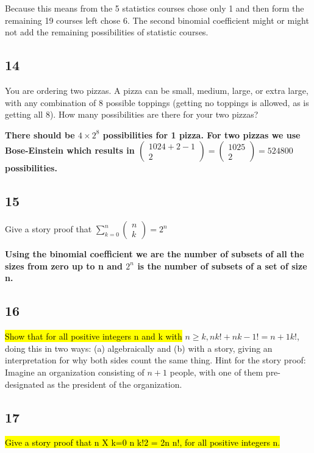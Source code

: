 \documentclass{article}
\begin{document}
\begin{enumerate}
    Because this means from the 5 statistics courses chose only 1 and then form the remaining 19 courses left chose 6. The second binomial coefficient might or might not add the remaining possibilities of statistic courses.
\end{enumerate}
\subsection{14}
You are ordering two pizzas. A pizza can be small, medium, large, or extra large, with any combination of 8 possible toppings (getting no toppings is allowed, as is getting all 8). How many possibilities are there for your two pizzas?

\textbf{There should be $4\times 2^8$ possibilities for 1 pizza. For two pizzas we use Bose-Einstein which results in $\begin{pmatrix}
1024+2-1 \\
2
\end{pmatrix} = \begin{pmatrix}
1025\\
2
\end{pmatrix}=524800$ possibilities.}
\subsection{15}
Give a story proof that $\sum_{k=0}^{n} \begin{pmatrix}
n\\
k
\end{pmatrix}  = 2^n$

\textbf{Using the binomial coefficient we are the number of subsets of all the sizes from zero up to n and $2^n$ is the number of subsets of a set of size n.
}

\subsection{16}

\hl{Show that for all positive integers n and k with} $n \geq k, n k!+ n k - 1!= n + 1 k !$, doing this in two ways: (a) algebraically and (b) with a story, giving an interpretation for why both sides count the same thing. Hint for the story proof: Imagine an organization consisting of $n + 1$ people, with one of them pre-designated as the president of the organization.

\subsection{17}
\hl{Give a story proof that
n X k=0 n k!2 = 2n n!,
for all positive integers n.}
\end{document}
